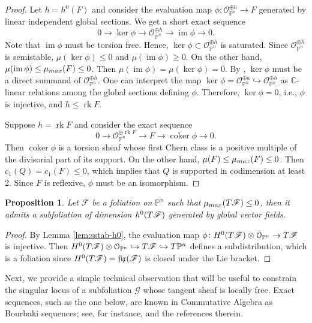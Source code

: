 \documentclass[twoside]{amsart}
\numberwithin{equation}{section}
\newcommand{\opn}{{\mathcal O}_{\mathbb{P}^{n}}}
\newcommand{\pn}{{\mathbb{P}^{n}}}
\newcommand{\tpn}{T{\mathbb{P}^{n}}}
\DeclareMathOperator{\im}{im}
\DeclareMathOperator{\rk}{rk}
\DeclareMathOperator{\coker}{coker}
\def\CC{{\mathbb{C}}}
\newcommand{\sF}{\mathscr{F}}
\newcommand{\sG}{\mathscr{G}}
\newcommand{\tF}{{\rm T}\sF}
\newcommand{\lra}{ \longrightarrow }
\newcommand{\fix}{\mathfrak{fix}}
\newtheorem{proposition}[theorem]{Proposition}
\theoremstyle{definition}
\begin{document}
\begin{proof}
Let $h = h^0(F)$ and consider the evaluation map $\phi \colon \opn^{\oplus h} \to F$ generated by linear independent global sections. We get a short exact sequence
\[
0 \lra \ker \phi \lra \opn^{\oplus h} \lra \im \phi \lra 0.
\]
Note that $\im \phi$ must be torsion free. Hence, $\ker \phi \subset \opn^{\oplus h}$ is saturated. Since $\opn^{\oplus h}$ is semistable, $\mu(\ker \phi) \leq 0$ and $\mu(\im \phi) \geq 0$. On the other hand, $\mu(\im \phi) \leq \mu_{\rm max}(F) \leq 0$. Then $\mu(\im \phi) = \mu(\ker \phi) = 0$. By \cite[Corollary 1.6.11]{HL-sheaves}, $\ker \phi$ must be a direct summand of $\opn^{\oplus h}$. One can interpret the map $\ker \phi = \opn^{\oplus a} \hookrightarrow \opn^{\oplus h}$ as $\CC$-linear relations among the global sections defining $\phi$. Therefore, $\ker \phi = 0$, i.e., $\phi$ is injective, and $h\leq \rk F$. 

Suppose $h = \rk F$ and consider the exact sequence
\[
0 \lra \opn^{\oplus \rk F} \lra F \lra \coker\phi \lra 0.
\]
Then $\coker\phi$ is a torsion sheaf whose first Chern class is a positive multiple of the divisorial part of its support. On the other hand, $\mu(F) \leq \mu_{\rm max}(F) \leq 0$. Then $c_1(Q) = c_1(F)  \leq 0$, which implies that $Q$ is supported in codimension at least 2. Since $F$ is reflexive, $\phi$ must be an isomorphism. 
\end{proof}


\begin{proposition}\label{prop:sstable-subfol}
Let $\sF$ be a foliation on $\pn$ such that $\mu_{\rm max}(\tF) \leq 0$, then it admits a subfoliation of dimension $h^0(\tF)$ generated by global vector fields.
\end{proposition}

\begin{proof}
By Lemma \ref{lem:sstab-h0}, the evaluation map  $\phi \colon H^0(\tF) \otimes \opn \to \tF$ is injective. Then $H^0(\tF)\otimes \opn \hookrightarrow \tF \hookrightarrow \tpn$ defines a subdistribution, which is a foliation since $H^0(\tF) = \fix(\sF)$ is closed under the Lie bracket. 
\end{proof}





Next, we provide a simple technical observation that will be useful to constrain the singular locus of a subfoliation $\sG$ whose tangent sheaf is locally free. Exact sequences, such as the one below, are known in Commutative Algebra as Bourbaki sequences; see, for instance, \cite{HKS} and the references therein. 
\end{document}
